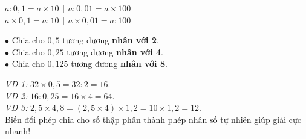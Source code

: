 \documentclass[14pt,a4paper,oneside]{extbook}
\begin{document}
\noindent
\begin{minipage}[t]{0.50\textwidth}
  \begin{tcolorbox}[
    enhanced,
    title={\footnotesize\bfseries\color{white}\faExchange\ 2. Cặp phép tính tương đương},
    colback=teal!2!white,
    colframe=teal!75!black,
    arc=2.5mm, boxrule=0.8pt, top=1.8mm, bottom=1.8mm, left=2.2mm, right=2.2mm
  ]
    \footnotesize
    \begin{tcolorbox}[colback=white, colframe=teal!75!black, boxrule=0.5pt, arc=1.5mm, halign=center, top=1mm, bottom=1mm]
      {\scriptsize\bfseries\color{teal!95!black}$a : 0,1 = a \times 10$ \quad | \quad $a : 0,01 = a \times 100$}\\[1.5pt]
      {\scriptsize\bfseries\color{blue!85!black}$a \times 0,1 = a : 10$ \quad | \quad $a \times 0,01 = a : 100$}
    \end{tcolorbox}
    $\bullet$ Chia cho $0,5$ tương đương \textbf{nhân với 2}.\\
    $\bullet$ Chia cho $0,25$ tương đương \textbf{nhân với 4}.\\
    $\bullet$ Chia cho $0,125$ tương đương \textbf{nhân với 8}.
  \end{tcolorbox}
\end{minipage}%
\hfill
\begin{minipage}[t]{0.48\textwidth}
  \begin{tcolorbox}[
    enhanced,
    title={\footnotesize\bfseries\color{white}\faLightbulbO\ 3. Ứng dụng tính nhanh},
    colback=purple!2!white,
    colframe=purple!70!black,
    arc=2.5mm, boxrule=0.8pt, top=1.8mm, bottom=1.8mm, left=2mm, right=2mm
  ]
    \footnotesize
    \textit{VD 1:} $32 \times 0,5 = 32 : 2 = 16$.\\
    \textit{VD 2:} $16 : 0,25 = 16 \times 4 = 64$.\\
    \textit{VD 3:} $2,5 \times 4,8 = (2,5 \times 4) \times 1,2 = 10 \times 1,2 = 12$.\\[2pt]
    Biến đổi phép chia cho số thập phân thành phép nhân số tự nhiên giúp giải cực nhanh!
  \end{tcolorbox}
\end{minipage}

\vspace{3mm}
\end{document}
